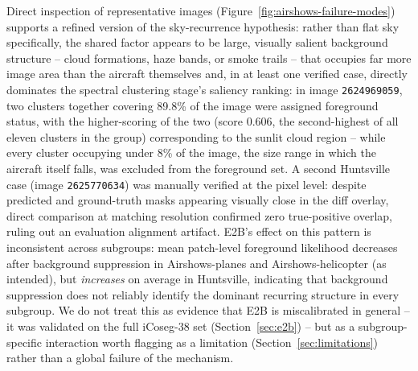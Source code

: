 Direct inspection of representative images (Figure~\ref{fig:airshows-failure-modes}) supports a refined version of the sky-recurrence hypothesis: rather than flat sky specifically, the shared factor appears to be large, visually salient background structure -- cloud formations, haze bands, or smoke trails -- that occupies far more image area than the aircraft themselves and, in at least one verified case, directly dominates the spectral clustering stage's saliency ranking: in image \texttt{2624969059}, two clusters together covering 89.8\% of the image were assigned foreground status, with the higher-scoring of the two (score 0.606, the second-highest of all eleven clusters in the group) corresponding to the sunlit cloud region -- while every cluster occupying under 8\% of the image, the size range in which the aircraft itself falls, was excluded from the foreground set. A second Huntsville case (image \texttt{2625770634}) was manually verified at the pixel level: despite predicted and ground-truth masks appearing visually close in the diff overlay, direct comparison at matching resolution confirmed zero true-positive overlap, ruling out an evaluation alignment artifact. E2B's effect on this pattern is inconsistent across subgroups: mean patch-level foreground likelihood decreases after background suppression in Airshows-planes and Airshows-helicopter (as intended), but \emph{increases} on average in Huntsville, indicating that background suppression does not reliably identify the dominant recurring structure in every subgroup. We do not treat this as evidence that E2B is miscalibrated in general -- it was validated on the full iCoseg-38 set (Section~\ref{sec:e2b}) -- but as a subgroup-specific interaction worth flagging as a limitation (Section~\ref{sec:limitations}) rather than a global failure of the mechanism.
